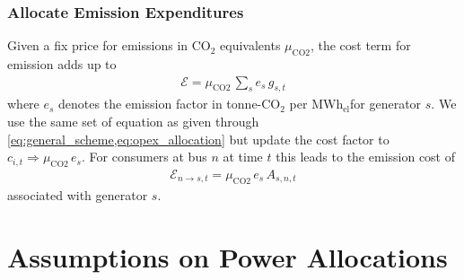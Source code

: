 \documentclass[11pt,twocolumn]{article}
\newcommand{\costfactor}{c_{i,t}}
\newcommand{\generation}{g_{s,t}}
\newcommand{\allocatepeer}[1][s, n]{A_{#1,t}}
\newcommand{\allocateemissioncost}[1][n]{\mathcal{E}_{#1,t}}
\newcommand{\emission}{e_{s}}
\newcommand{\emissionprice}{\mu_{\text{CO2}}}
\newcommand{\megawatthour}{MWh$_\text{el}$}
\newcommand{\emissioncost}{\mathcal{E}}
\begin{document}
\subsubsection*{Allocate Emission Expenditures}

Given a fix price for emissions in CO$_2$ equivalents $\emissionprice$, the cost term for emission adds up to 
\begin{align}
 \emissioncost = \emissionprice \, \sum_s  \emission \, \generation
\end{align}
where $\emission$ denotes the emission factor in tonne-CO$_2$ per \megawatthour for generator $s$.
We use the same set of equation as given through \cref{eq:general_scheme,eq:opex_allocation} but update the cost factor to $\costfactor \Rightarrow \emissionprice \, \emission$. For consumers at bus $n$ at time $t$ this leads to the emission cost of 
\begin{align}
 \allocateemissioncost[n \rightarrow s] = \emissionprice \, \emission \, \allocatepeer
\end{align}
associated with generator $s$.


\section{Assumptions on Power Allocations}
\label{sec:localizing_allocations}
\end{document}
